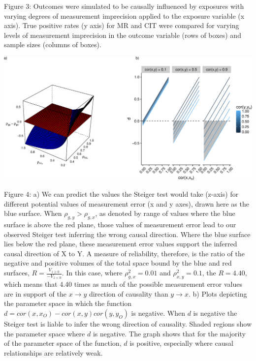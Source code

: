 \documentclass[]{article}
\begin{document}
Figure 3: Outcomes were simulated to be causally influenced by exposures
with varying degrees of measurement imprecision applied to the exposure
variable (x axis). True positive rates (y axis) for MR and CIT were
compared for varying levels of measurement imprecision in the outcome
variable (rows of boxes) and sample sizes (columns of boxes).

\newpage

\includegraphics{manuscript_files/figure-latex/steiger_sensitivity_plot-1.pdf}

Figure 4: a) We can predict the values the Steiger test would take
(z-axis) for different potential values of measurement error (x and y
axes), drawn here as the blue surface. When \(\rho_{g,y} > \rho_{g,x}\),
as denoted by range of values where the blue surface is above the red
plane, those values of measurement error lead to our observed Steiger
test inferring the wrong causal direction. Where the blue surface lies
below the red plane, these measurement error values support the inferred
causal direction of X to Y. A measure of reliability, therefore, is the
ratio of the negative and positive volumes of the total space bound by
the blue and red surfaces, \(R = \frac{V_{z \geq 0}}{ - V_{z < 0} }\).
In this case, where \(\rho_{g,x}^2 = 0.01\) and \(\rho_{x,y}^2 = 0.1\),
the \(R = 4.40\), which means that 4.40 times as much of the possible
measurement error values are in support of the \(x \rightarrow y\)
direction of causality than \(y \rightarrow x\). b) Plots depicting the
parameter space in which the function
\(d = cor(x, x_O) - cor(x,y)cor(y, y_O)\) is negative. When \(d\) is
negative the Steiger test is liable to infer the wrong direction of
causality. Shaded regions show the parameter space where \(d\) is
negative. The graph shows that for the majority of the parameter space
of the function, \(d\) is positive, especially where causal
relationships are relatively weak.
\end{document}
